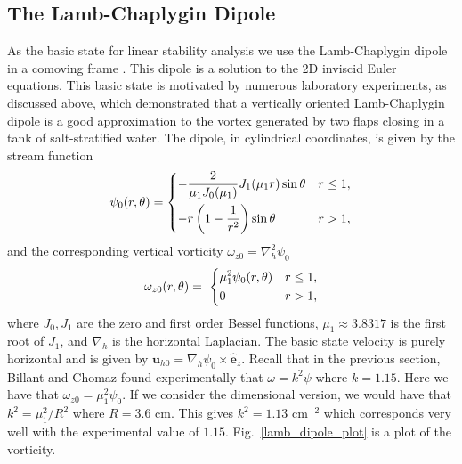 \subsection{The Lamb-Chaplygin Dipole} 
As the basic state for linear stability analysis we use the Lamb-Chaplygin dipole in a comoving frame \cite{meleshko1994}. This dipole is a solution to the 2D inviscid Euler equations. This basic state is motivated by numerous laboratory experiments\cite{bc2000a,leweke1998}, as discussed above, which demonstrated that a vertically oriented Lamb-Chaplygin dipole is a good approximation to the vortex generated by two flaps closing in a tank of salt-stratified water. The dipole, in cylindrical coordinates, is given by the stream function
\begin{align}
\psi_{0}(r,\theta) = 
\begin{dcases}
-\frac{2}{\mu_{1}J_{0}(\mu_{1})}J_{1}(\mu_{1}r)\sin\theta & r\le 1,\\\label{lc_dipole_sf}
-r\left(1-\frac{1}{r^{2}}\right)\sin\theta & r>1 ,
\end{dcases}
\end{align}
and the corresponding vertical vorticity $\omega_{z0}=\nabla_{h}^{2}\psi_{0}$
\begin{align}
\omega_{z0}(r,\theta) = \
\begin{dcases}
\mu_{1}^{2}\psi_{0}(r,\theta) & r\le 1,\\
0 & r>1,
\end{dcases}
\end{align}
where $J_{0},J_{1}$ are the zero and first order Bessel functions, $\mu_{1}\approx 3.8317$ is the first root of $J_{1}$, and $\nabla_{h}$ is the horizontal Laplacian. The basic state velocity is purely horizontal and is given by $\bm{u}_{h0}=\nabla_{h}\psi_{0}\times\hat{\bm{e}}_{z}$. Recall that in the previous section, Billant and Chomaz found experimentally that $\omega = k^{2}\psi$ where $k=1.15$. Here we have that $\omega_{z0}=\mu_{1}^{2}\psi_{0}$. If we consider the dimensional version, we would have that $k^{2} = \mu_{1}^{2}/R^{2}$ where $R=3.6$ cm. This gives $k^{2} = 1.13 \text{ cm}^{-2}$ which corresponds very well with the experimental value of $1.15$. Fig.~\ref{lamb_dipole_plot} is a plot of the vorticity. 

